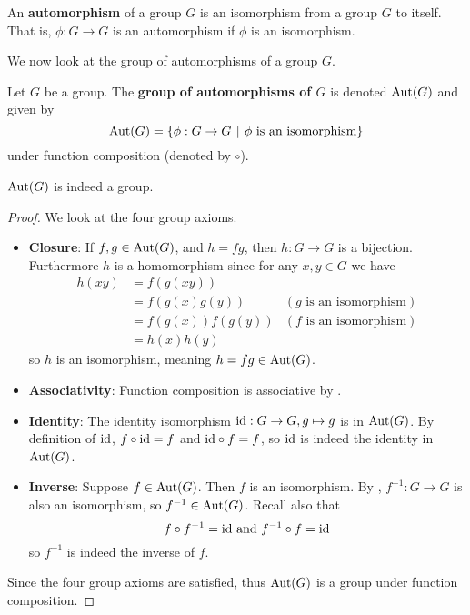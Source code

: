 \begin{definition}
    An \textbf{automorphism} of a group $G$ is an isomorphism from a group $G$ to itself. That is, $\phi: G \to G$ is an automorphism if $\phi$ is an isomorphism.
\end{definition}

We now look at the group of automorphisms of a group $G$.

\begin{definition}
    Let $G$ be a group. The \textbf{group of automorphisms of $G$} is denoted $\mathrm{Aut}(G)$ and given by
    \[
        \Aut{G} = \{\phi: G \to G \vert \phi \text{ is an isomorphism}\}
    \]
    under function composition (denoted by $\circ$).
\end{definition}

\begin{proposition}
    $\mathrm{Aut}(G)$ is indeed a group.
\end{proposition}
\begin{proof}
    We look at the four group axioms.
    \begin{itemize}
        \item \textbf{Closure}: If $f, g \in \mathrm{Aut}(G)$, and $h = fg$, then $h: G \to G$ is a bijection. Furthermore $h$ is a homomorphism since for any $x, y \in G$ we have
        \begin{align*}
            h(xy) &= f(g(xy))\\
            &= f(g(x)g(y)) & (g \text{ is an isomorphism})\\
            &= f(g(x))f(g(y)) & (f \text{ is an isomorphism})\\
            &= h(x)h(y)
        \end{align*}
        so $h$ is an isomorphism, meaning $h = fg \in \mathrm{Aut}(G)$.

        \item \textbf{Associativity}: Function composition is associative by .

        \item \textbf{Identity}: The identity isomorphism $\mathrm{id}: G \to G, g \mapsto g$ is in $\mathrm{Aut}(G)$. By definition of $\mathrm{id}$, $f \circ \mathrm{id} = f$ and $\mathrm{id} \circ f = f$, so $\mathrm{id}$ is indeed the identity in $\mathrm{Aut}(G)$.

        \item \textbf{Inverse}: Suppose $f \in \mathrm{Aut}(G)$. Then $f$ is an isomorphism. By , $f^{-1}: G \to G$ is also an isomorphism, so $f^{-1} \in \mathrm{Aut}(G)$. Recall also that
        \[
            f\circ f^{-1} = \mathrm{id} \text{ and } f^{-1}\circ f = \mathrm{id}
        \]
        so $f^{-1}$ is indeed the inverse of $f$.
    \end{itemize}
    Since the four group axioms are satisfied, thus $\mathrm{Aut}(G)$ is a group under function composition.
\end{proof}

